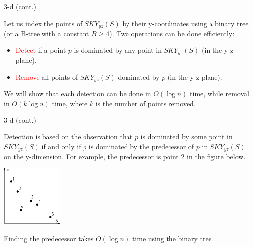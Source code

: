 \documentclass{beamer}
\newcommand{\red}[1]{\textcolor{red}{#1}}
\begin{document}
\begin{frame}{3-d (cont.)}\label{fra:3d-tree}
\begin{small}
    Let us index the points of $SKY_{yz}(S)$ by their y-coordinates using a binary tree (or a B-tree with a constant $B \ge 4$). Two operations can be done efficiently:
    \begin{itemize}
        \item \red{Detect} if a point $p$ is dominated by any point in $SKY_{yz}(S)$ (in the y-z plane).

        \item \red{Remove} all points of $SKY_{yz}(S)$ dominated by $p$ (in the y-z plane).
    \end{itemize}

    We will show that each detection can be done in $O(\log n)$ time, while removal in $O(k \log n)$ time, where $k$ is the number of points removed.
\end{small}
\end{frame}
\begin{frame}{3-d (cont.)}
\begin{small}
    Detection is based on the observation that $p$ is dominated by some point in $SKY_{yz}(S)$ if and only if $p$ is dominated by the predecessor of $p$ in $SKY_{yz}(S)$ on the y-dimension. For example, the predecessor is point 2 in the figure below.
    \begin{center}
        \includegraphics[height=30mm]{./artwork/3d.eps}
    \end{center}
    Finding the predecessor takes $O(\log n)$ time using the binary tree.
\end{small}
\end{frame}
\end{document}
